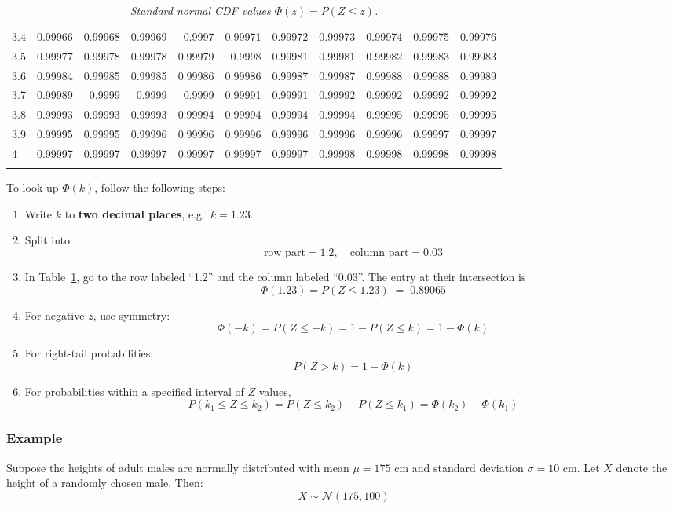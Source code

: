 \documentclass[twoside]{book}
\begin{document}
\begin{table}[!h]
\begin{tabular}{l|*{10}{r}}
3.4 & 0.99966 & 0.99968 & 0.99969 & 0.9997  & 0.99971 & 0.99972 & 0.99973 & 0.99974 & 0.99975 & 0.99976 \\
3.5 & 0.99977 & 0.99978 & 0.99978 & 0.99979 & 0.9998  & 0.99981 & 0.99981 & 0.99982 & 0.99983 & 0.99983 \\
3.6 & 0.99984 & 0.99985 & 0.99985 & 0.99986 & 0.99986 & 0.99987 & 0.99987 & 0.99988 & 0.99988 & 0.99989 \\
3.7 & 0.99989 & 0.9999  & 0.9999  & 0.9999  & 0.99991 & 0.99991 & 0.99992 & 0.99992 & 0.99992 & 0.99992 \\
3.8 & 0.99993 & 0.99993 & 0.99993 & 0.99994 & 0.99994 & 0.99994 & 0.99994 & 0.99995 & 0.99995 & 0.99995 \\
3.9 & 0.99995 & 0.99995 & 0.99996 & 0.99996 & 0.99996 & 0.99996 & 0.99996 & 0.99996 & 0.99997 & 0.99997 \\
4   & 0.99997 & 0.99997 & 0.99997 & 0.99997 & 0.99997 & 0.99997 & 0.99998 & 0.99998 & 0.99998 & 0.99998 \\
\addlinespace
\bottomrule
\end{tabular}
\caption{\textit{Standard normal CDF values $\Phi(z)=P(Z\le z)$.}}
\label{table:Ztable}
\end{table}

To look up \(\Phi(k)\), follow the following steps:

\begin{enumerate}
  \item Write \(k\) to \textbf{two decimal places}, e.g.\ \(k=1.23\).
  \item Split into
    \[
      \text{row part} = 1.2,\quad
      \text{column part} = 0.03
    \]
  \item In Table~\ref{table:Ztable}, go to the row labeled “1.2” and the column
    labeled “0.03”.  The entry at their intersection is
    \[
      \Phi(1.23) = P(Z\le 1.23) \;=\; 0.89065
    \]
  \item For negative \(z\), use symmetry:
    \[
      \Phi(-k) = P(Z\le -k)
      = 1 - P(Z\le k) = 1 - \Phi(k)
    \]
  \item For right‐tail probabilities,
    \[
      P(Z>k) = 1 - \Phi(k)
    \]
  \item For probabilities within a specified interval of $ Z $ values,
  $$P(k_1 \leq Z \leq k_2) = P(Z \leq k_2) - P(Z \leq k_1) = \Phi(k_2) - \Phi(k_1)$$
\end{enumerate}

\subsubsection{Example}
Suppose the heights of adult males are normally distributed with mean $\mu = 175$ cm and standard deviation $\sigma = 10$ cm. Let $X$ denote the height of a randomly chosen male. Then:
\[
X \sim \mathcal{N}(175, 100)
\]
\end{document}
